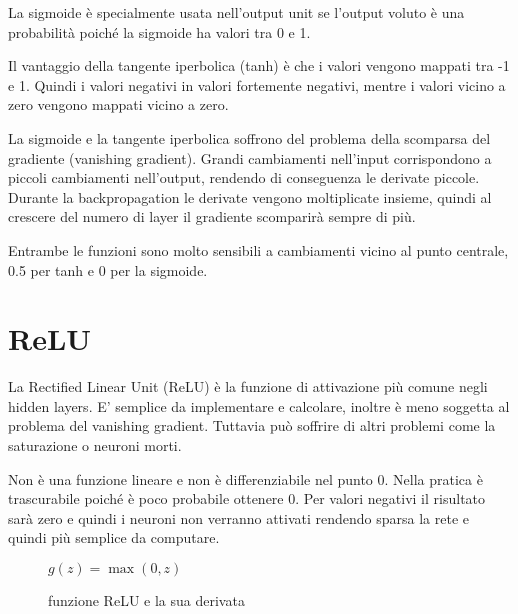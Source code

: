 La sigmoide è specialmente usata nell'output unit se l'output voluto è una probabilità poiché la sigmoide ha valori tra 0 e 1.

Il vantaggio della tangente iperbolica (tanh) è che i valori vengono mappati tra -1 e 1. Quindi i valori negativi in valori fortemente negativi, mentre i valori vicino a zero vengono mappati vicino a zero.

La sigmoide e la tangente iperbolica soffrono del problema della scomparsa del gradiente (vanishing gradient).
Grandi cambiamenti nell'input corrispondono a piccoli cambiamenti nell'output, rendendo di conseguenza le derivate piccole.
Durante la backpropagation le derivate vengono moltiplicate insieme, quindi al crescere del numero di layer il gradiente scomparirà sempre di più.

Entrambe le funzioni sono molto sensibili a cambiamenti vicino al punto centrale, 0.5 per tanh e 0 per la sigmoide.

\section{ReLU}
La Rectified Linear Unit (ReLU) è la funzione di attivazione più comune negli hidden layers.
E' semplice da implementare e calcolare, inoltre è meno soggetta al problema del vanishing gradient.
Tuttavia può soffrire di altri problemi come la saturazione o neuroni morti.

Non è una funzione lineare e non è differenziabile nel punto 0. Nella pratica è trascurabile poiché è poco probabile ottenere 0.
Per valori negativi il risultato sarà zero e quindi i neuroni non verranno attivati rendendo sparsa la rete e quindi più semplice da computare.

\begin{figure}[ht]
  \centering
  
  $g(z) = \max(0, z)$
  \caption{funzione ReLU e la sua derivata}
\end{figure}

